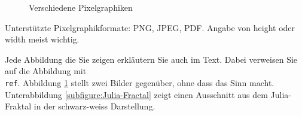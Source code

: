\begin{figure}[h]
	\centering
	\qquad
	\caption[
		Verschiedene Pixelgraphiken\newline
		\small\texttt{https://mediacube.at/wiki/}
	]{
		Verschiedene Pixelgraphiken
	}
	\label{figure:PixelImages}
\end{figure}

Unterstützte Pixelgraphikformate: PNG, JPEG, PDF.
Angabe von height oder width meist wichtig.

Jede Abbildung die Sie zeigen erkläutern Sie auch im Text. Dabei verweisen Sie auf die
Abbildung mit \texttt{\\ref}. Abbildung \ref{figure:PixelImages} stellt zwei Bilder gegenüber,
ohne dass das Sinn macht.  Unterabbildung \ref{subfigure:Julia-Fractal} zeigt einen
Ausschnitt aus dem Julia-Fraktal in der schwarz-weiss Darstellung.

